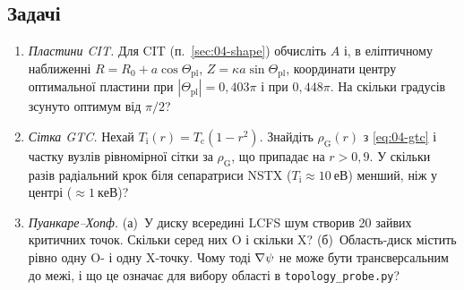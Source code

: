 \subsection*{Задачі}
\begin{enumerate}
\item \emph{Пластини CIT.} Для CIT (п.~\ref{sec:04-shape}) обчисліть $A$ і, в еліптичному наближенні $R=R_0+a\cos\Theta_{\mathrm{pl}}$, $Z=\kappa a\sin\Theta_{\mathrm{pl}}$, координати центру оптимальної пластини при $|\Theta_{\mathrm{pl}}|=0{,}403\pi$ і при $0{,}448\pi$. На скільки градусів зсунуто оптимум від $\pi/2$?
\item \emph{Сітка GTC.} Нехай $T_{\mathrm i}(r)=T_{\mathrm c}(1-r^2)$. Знайдіть $\rho_{\mathrm G}(r)$ з \eqref{eq:04-gtc} і частку вузлів рівномірної сітки за $\rho_{\mathrm G}$, що припадає на $r>0{,}9$. У скільки разів радіальний крок біля сепаратриси NSTX ($T_{\mathrm i}\approx\SI{10}{еВ}$) менший, ніж у центрі ($\approx\SI{1}{кеВ}$)?
\item \emph{Пуанкаре--Хопф.} (а)~У диску всередині LCFS шум створив 20 зайвих критичних точок. Скільки серед них O і скільки X? (б)~Область-диск містить рівно одну O- і одну X-точку. Чому тоді $\nabla\psi$ не може бути трансверсальним до межі, і що це означає для вибору області в \texttt{topology\_probe.py}?
\end{enumerate}
